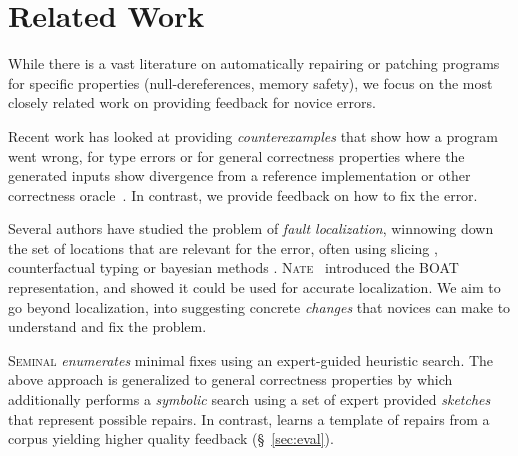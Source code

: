 \section{Related Work}
\label{sec:related-work}

While there is a vast literature on automatically repairing or patching programs
for specific properties (\eg null-dereferences, memory safety), we focus on the
most closely related work on providing feedback for novice errors.

%
Recent work has looked at providing \emph{counterexamples} that show how a
program went wrong, for type errors \cite{Seidel2016-ul} or for general
correctness properties where the generated inputs show divergence from a
reference implementation or other correctness oracle~\cite{Song_2019}. In
contrast, we provide feedback on how to fix the error.

 Several authors have studied the problem of
\emph{fault localization}, \ie winnowing down the set of locations that are
relevant for the error, often using slicing
\citep{Wand1986-nw,Haack2003-vc,Tip2001-qp,Rahli2015-tt}, counterfactual typing
\citep{Chen2014-gd} or bayesian methods \citep{Zhang2014-lv}.
%
\textsc{Nate}~\citep{Seidel:2017} introduced the BOAT representation,
and showed it could be used for accurate localization.
%
We aim to go beyond localization, into suggesting concrete \emph{changes} that
novices can make to understand and fix the problem.

%
\textsc{Seminal} \citep{Lerner2007-dt} \emph{enumerates} minimal fixes using an
expert-guided heuristic search.
%
The above approach is generalized to general correctness properties by
\cite{singh2013} which additionally performs a \emph{symbolic} search using a
set of expert provided \emph{sketches} that represent possible repairs.
%
In contrast, \toolname learns a template of repairs from a corpus yielding
higher quality feedback (\S~\ref{sec:eval}).

